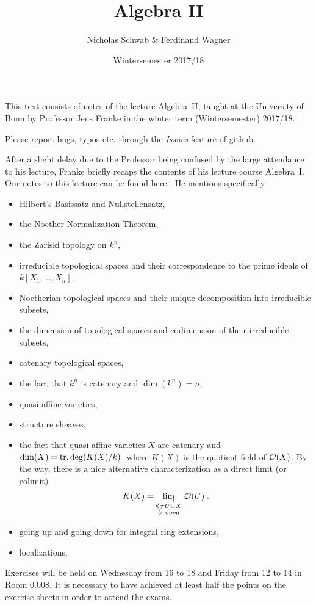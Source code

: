 \documentclass[a4paper,parskip=half,numbers=enddot, DIV=12, headheight=30pt]{scrreprt}
\title{Algebra II}
\author{Nicholas Schwab \& Ferdinand Wagner}
\date{Wintersemester 2017/18}
\begin{document}
\maketitle
{}
 \thispagestyle{plain}
This text consists of notes of the lecture Algebra~II, taught at the University of Bonn by Professor Jens Franke in the winter term (Wintersemester) 2017/18. 

Please report bugs, typos etc. through the \emph{Issues} feature of github.

\tableofcontents

After a slight delay due to the Professor being confused by the large attendance to his lecture, Franke briefly recaps the contents of his lecture course Algebra~I. Our notes to this lecture can be found \href{https://github.com/Nicholas42/AlgebraFranke/tree/master/AlgebraI}{here} \cite{alg1}. He mentions specifically
\begin{itemize}
 \item Hilbert's Basissatz and Nullstellensatz,
 \item the Noether Normalization Theorem,
 \item the Zariski topology on $k^n$,
 \item irreducible topological spaces and their correspondence to the prime ideals of $k[X_1, \ldots, X_n]$,
 \item Noetherian topological spaces and their unique decomposition into irreducible subsets,
 \item the dimension of topological spaces and codimension of their irreducible subsets,
 \item catenary topological spaces,
 \item the fact that $k^n$ is catenary and $\dim(k^n) = n$,
 \item quasi-affine varieties,
 \item structure sheaves,
 \item the fact that quasi-affine varieties $X$ are catenary and $\dim (X) = \operatorname{tr.deg}(K(X)/k)$, where $K(X)$ is the quotient field of $\mathcal{O}(X)$. By the way, there is a nice alternative characterization as a direct limit (or colimit)
 \begin{align*}
 	K(X)=\colimit[\substack{\emptyset\not=U\subseteq X\\U\text{ open}}]\Oo(U)\;.
 \end{align*}
 \item going up and going down for integral ring extensions,
 \item localizations.
\end{itemize}
Exercises will be held on Wednesday from 16 to 18 and Friday from 12 to 14 in Room 0.008. It is necessary to have achieved at least half the points on the exercise sheets in order to attend the exams.
\end{document}
